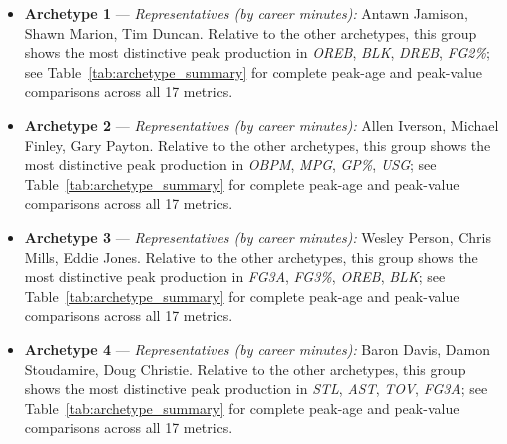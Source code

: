 \begin{itemize}
\item \textbf{Archetype 1} --- \emph{Representatives (by career minutes):} Antawn Jamison, Shawn Marion, Tim Duncan. Relative to the other archetypes, this group shows the most distinctive peak production in \textit{OREB}, \textit{BLK}, \textit{DREB}, \textit{FG2\%}; see Table~\ref{tab:archetype_summary} for complete peak-age and peak-value comparisons across all 17 metrics.
\item \textbf{Archetype 2} --- \emph{Representatives (by career minutes):} Allen Iverson, Michael Finley, Gary Payton. Relative to the other archetypes, this group shows the most distinctive peak production in \textit{OBPM}, \textit{MPG}, \textit{GP\%}, \textit{USG}; see Table~\ref{tab:archetype_summary} for complete peak-age and peak-value comparisons across all 17 metrics.
\item \textbf{Archetype 3} --- \emph{Representatives (by career minutes):} Wesley Person, Chris Mills, Eddie Jones. Relative to the other archetypes, this group shows the most distinctive peak production in \textit{FG3A}, \textit{FG3\%}, \textit{OREB}, \textit{BLK}; see Table~\ref{tab:archetype_summary} for complete peak-age and peak-value comparisons across all 17 metrics.
\item \textbf{Archetype 4} --- \emph{Representatives (by career minutes):} Baron Davis, Damon Stoudamire, Doug Christie. Relative to the other archetypes, this group shows the most distinctive peak production in \textit{STL}, \textit{AST}, \textit{TOV}, \textit{FG3A}; see Table~\ref{tab:archetype_summary} for complete peak-age and peak-value comparisons across all 17 metrics.
\end{itemize}
